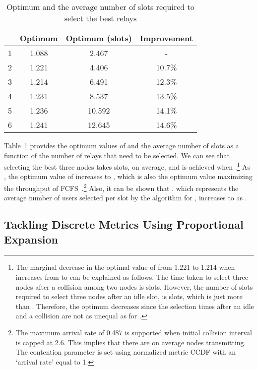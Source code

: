 \documentclass[12pt,draftcls,peerreview, onecolumn]{IEEEtran}
\begin{document}
\begin{table}[p]
\renewcommand{\arraystretch}{1.2}
\caption{Optimum  and the average number of slots required to select the best  relays}
\centering
\begin{tabular}{| c | c | c | c |}
\hline
         & Optimum  & Optimum  (slots) & Improvement\\
        \hline
        1 & 1.088 & 2.467 & - \\
        2 & 1.221 & 4.406 & 10.7\% \\
        3 & 1.214 & 6.491 & 12.3\% \\
        4 & 1.231 & 8.537 & 13.5\% \\
        5 & 1.236 & 10.592 & 14.1\% \\
        6 & 1.241 & 12.645 & 14.6\% \\
        \hline
\end{tabular}
\label{table:optimum p_e}
\end{table}


Table~\ref{table:optimum p_e} provides the optimum values of  and
the average number of slots as a function of the number of relays that
need to be selected. We can see that selecting the best three nodes
takes  slots, on average, and is achieved when .\footnote{The marginal decrease in the optimal value of 
  from 1.221 to 1.214 when  increases from  to  can be
  explained as follows.  The time taken to select three nodes after a
  collision among two nodes is  slots. However, the
  number of slots required to select three nodes after an idle slot,
  is  slots, which is just  more than . Therefore,
  the optimum  decreases since the selection times after an idle
  and a collision are not as unequal as for .} As , the optimum value of  increases to , which is
also the optimum value maximizing the throughput of
FCFS~\cite{bertsekas_gallager}.\footnote{The maximum arrival rate of
  0.487 is supported when initial collision interval is capped at 2.6.
  This implies that there are on average 
  nodes transmitting.  The contention parameter  is set using
  normalized metric CCDF with an `arrival rate' equal to 1.}  Also, it
can be shown that , which
represents the average number of users selected per slot by the
algorithm for , increases to  as .




\subsection{Tackling Discrete Metrics Using Proportional Expansion}
\label{sec:discrete_metric}
\end{document}
